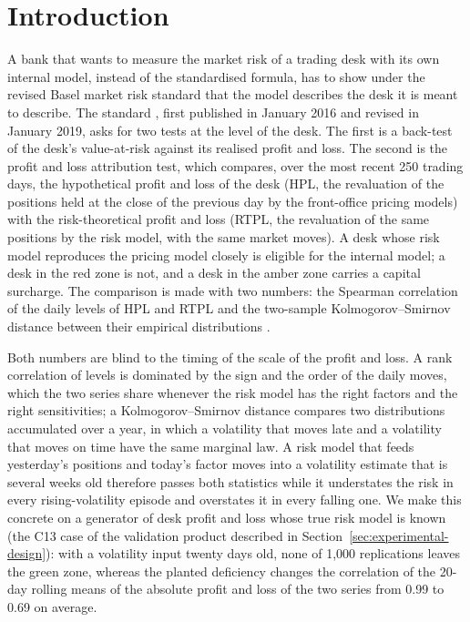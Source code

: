 \section{Introduction}
\label{sec:introduction}

A bank that wants to measure the market risk of a trading desk with its own internal model, instead of the standardised formula, has to show under the revised Basel market risk standard that the model describes the desk it is meant to describe.
The standard \citep{bcbs2019}, first published in January 2016 \citep{bcbs2016} and revised in January 2019, asks for two tests at the level of the desk.
The first is a back-test of the desk's value-at-risk against its realised profit and loss.
The second is the profit and loss attribution test, which compares, over the most recent 250 trading days, the hypothetical profit and loss of the desk (HPL, the revaluation of the positions held at the close of the previous day by the front-office pricing models) with the risk-theoretical profit and loss (RTPL, the revaluation of the same positions by the risk model, with the same market moves).
A desk whose risk model reproduces the pricing model closely is eligible for the internal model; a desk in the red zone is not, and a desk in the amber zone carries a capital surcharge.
The comparison is made with two numbers: the Spearman correlation of the daily levels of HPL and RTPL \citep{spearman1904} and the two-sample Kolmogorov--Smirnov distance between their empirical distributions \citep{smirnov1948}.

Both numbers are blind to the timing of the scale of the profit and loss.
A rank correlation of levels is dominated by the sign and the order of the daily moves, which the two series share whenever the risk model has the right factors and the right sensitivities; a Kolmogorov--Smirnov distance compares two distributions accumulated over a year, in which a volatility that moves late and a volatility that moves on time have the same marginal law.
A risk model that feeds yesterday's positions and today's factor moves into a volatility estimate that is several weeks old therefore passes both statistics while it understates the risk in every rising-volatility episode and overstates it in every falling one.
We make this concrete on a generator of desk profit and loss whose true risk model is known (the C13 case of the validation product described in Section~\ref{sec:experimental-design}): with a volatility input twenty days old, none of 1,000 replications leaves the green zone, whereas the planted deficiency changes the correlation of the 20-day rolling means of the absolute profit and loss of the two series from 0.99 to 0.69 on average.

